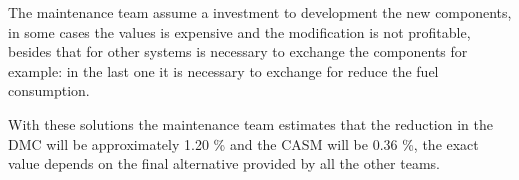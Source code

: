 The maintenance team assume a investment to development the new components, in some cases the values is expensive and the modification is not profitable, besides that for other systems is necessary to exchange the components for example: in the last one it is necessary to exchange for reduce the fuel consumption.

With these solutions the maintenance team estimates that the reduction in the DMC will be approximately 1.20 \% and the CASM will be 0.36 \%, the exact value depends on the final alternative provided by all the other teams.
